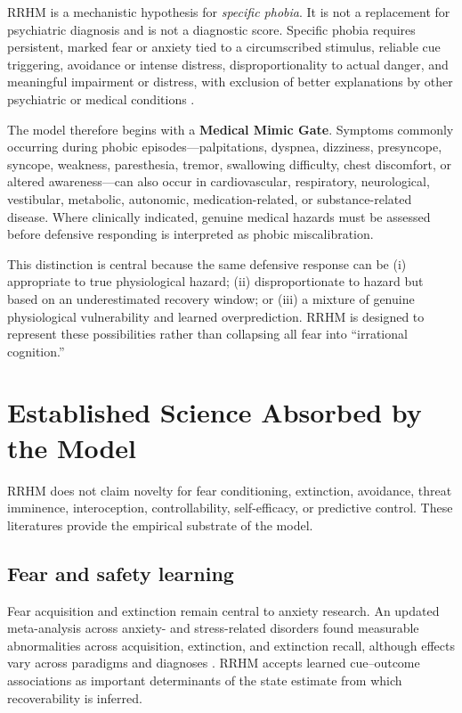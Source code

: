 \documentclass[11pt]{article}
\begin{document}
RRHM is a mechanistic hypothesis for \emph{specific phobia}. It is not a replacement for psychiatric diagnosis and is not a diagnostic score. Specific phobia requires persistent, marked fear or anxiety tied to a circumscribed stimulus, reliable cue triggering, avoidance or intense distress, disproportionality to actual danger, and meaningful impairment or distress, with exclusion of better explanations by other psychiatric or medical conditions \cite{who2024}.

The model therefore begins with a \textbf{Medical Mimic Gate}. Symptoms commonly occurring during phobic episodes---palpitations, dyspnea, dizziness, presyncope, syncope, weakness, paresthesia, tremor, swallowing difficulty, chest discomfort, or altered awareness---can also occur in cardiovascular, respiratory, neurological, vestibular, metabolic, autonomic, medication-related, or substance-related disease. Where clinically indicated, genuine medical hazards must be assessed before defensive responding is interpreted as phobic miscalibration.

This distinction is central because the same defensive response can be (i) appropriate to true physiological hazard; (ii) disproportionate to hazard but based on an underestimated recovery window; or (iii) a mixture of genuine physiological vulnerability and learned overprediction. RRHM is designed to represent these possibilities rather than collapsing all fear into ``irrational cognition.''

\section{Established Science Absorbed by the Model}

RRHM does not claim novelty for fear conditioning, extinction, avoidance, threat imminence, interoception, controllability, self-efficacy, or predictive control. These literatures provide the empirical substrate of the model.

\subsection{Fear and safety learning}

Fear acquisition and extinction remain central to anxiety research. An updated meta-analysis across anxiety- and stress-related disorders found measurable abnormalities across acquisition, extinction, and extinction recall, although effects vary across paradigms and diagnoses \cite{kausche2025}. RRHM accepts learned cue--outcome associations as important determinants of the state estimate from which recoverability is inferred.
\end{document}
